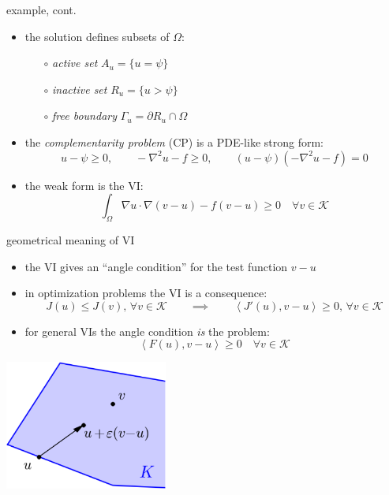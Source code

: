 \documentclass[svgnames,
               hyperref={colorlinks,citecolor=DeepPink4,linkcolor=FireBrick,urlcolor=Maroon},
               usepdftitle=false]  %
               {beamer}
\newcommand{\grad}{\nabla}
\newcommand{\ip}[2]{\left<#1,#2\right>}
\begin{document}
\begin{frame}{example, cont.}
\vspace{-1mm}
\begin{itemize}
\item the solution defines subsets of $\Omega$:
   \begin{itemize}
   \item[$\circ$] \emph{active set} $A_u = \{u = \psi\}$
   \item[$\circ$] \emph{inactive set} $R_u = \{u> \psi\}$
   \item[$\circ$] \emph{free boundary} $\Gamma_u=\partial R_u \cap \Omega$
   \end{itemize}
\item the \emph{complementarity problem} (CP) is a PDE-like strong form:
\begin{equation*}
u - \psi \ge 0, \qquad -\grad^2 u - f \ge 0, \qquad (u - \psi)(-\grad^2 u - f) = 0
\end{equation*}
\item the weak form is the VI:
    $$\int_\Omega \grad u\cdot \grad (v-u) - f (v-u) \ge 0 \quad \forall v \in \mathcal{K}$$
\end{itemize}
\end{frame}


\begin{frame}{geometrical meaning of VI}

\begin{itemize}
\item the VI gives an ``angle condition'' for the test function $v-u$
\item in optimization problems the VI is a consequence:
$$J(u) \le J(v), \, \forall v \in \mathcal{K} \qquad \implies \qquad \ip{J'(u)}{v-u} \ge 0, \, \forall v \in \mathcal{K}$$
\item for general VIs the angle condition \emph{is} the problem:
   $$\ip{F(u)}{v-u} \ge 0 \quad \forall v \in \mathcal{K}$$    
\end{itemize}

\bigskip
\begin{center}
\includegraphics[width=0.4\textwidth]{figs/convexuv.png}
\end{center}
\end{frame}
\end{document}
